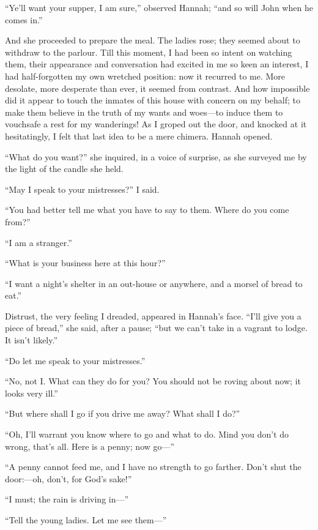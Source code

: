 \enquote{Ye'll want your supper, I am sure,} observed Hannah;
\enquote{and so will \Mr{} \St{} John when he comes in.}

And she proceeded to prepare the meal. The ladies rose; they seemed
about to withdraw to the parlour. Till this moment, I had been so
intent on watching them, their appearance and conversation had excited
in me so keen an interest, I had half-forgotten my own wretched
position: now it recurred to me. More desolate, more desperate than
ever, it seemed from contrast. And how impossible did it appear to
touch the inmates of this house with concern on my behalf; to make them
believe in the truth of my wants and woes---to induce them to vouchsafe
a rest for my wanderings! As I groped out the door, and knocked at it
hesitatingly, I felt that last idea to be a mere chimera. Hannah
opened.

\enquote{What do you want?} she inquired, in a voice of surprise, as she
surveyed me by the light of the candle she held.

\enquote{May I speak to your mistresses?} I said.

\enquote{You had better tell me what you have to say to them. Where do
you come from?}

\enquote{I am a stranger.}

\enquote{What is your business here at this hour?}

\enquote{I want a night's shelter in an out-house or anywhere, and a
morsel of bread to eat.}

Distrust, the very feeling I dreaded, appeared in Hannah's face. 
\enquote{I'll give you a piece of bread,} she said, after a pause;
\enquote{but we can't take in a vagrant to lodge. It isn't likely.}

\enquote{Do let me speak to your mistresses.}

\enquote{No, not I\@. What can they do for you? You should not be roving
about now; it looks very ill.}

\enquote{But where shall I go if you drive me away? What shall I do?}

\enquote{Oh, I'll warrant you know where to go and what to do. Mind you
don't do wrong, that's all. Here is a penny; now go---}

\enquote{A penny cannot feed me, and I have no strength to go farther. 
Don't shut the door:---oh, don't, for God's sake!}

\enquote{I must; the rain is driving in---}

\enquote{Tell the young ladies. Let me see them---}

